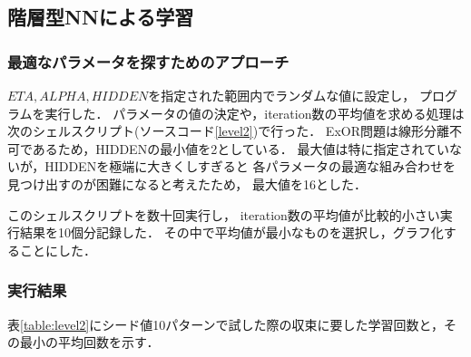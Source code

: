 \subsection{階層型NNによる学習}
\subsubsection{最適なパラメータを探すためのアプローチ}
% 

$ETA,ALPHA,HIDDEN$を指定された範囲内でランダムな値に設定し，
プログラムを実行した．
パラメータの値の決定や，iteration数の平均値を求める処理は
次のシェルスクリプト(ソースコード\ref{level2})で行った．
ExOR問題は線形分離不可であるため，HIDDENの最小値を2としている．
最大値は特に指定されていないが，HIDDENを極端に大きくしすぎると
各パラメータの最適な組み合わせを見つけ出すのが困難になると考えたため，
最大値を16とした．




このシェルスクリプトを数十回実行し，
iteration数の平均値が比較的小さい実行結果を10個分記録した．
その中で平均値が最小なものを選択し，グラフ化することにした．
%
%
%

\subsubsection{実行結果}


表\ref{table:level2}にシード値10パターンで試した際の収束に要した学習回数と，その最小の平均回数を示す．

